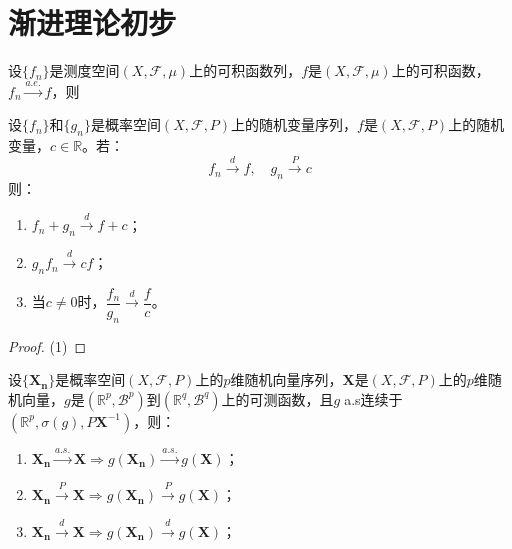 \chapter{渐进理论初步}

\begin{theorem}
	设$\{f_n\}$是测度空间$(X,\mathscr{F},\mu)$上的可积函数列，$f$是$(X,\mathscr{F},\mu)$上的可积函数，$f_n\overset{a.e.}{\longrightarrow}f$，则
\end{theorem}
\begin{theorem}\label{theo:Slutsky}
	设$\{f_n\}$和$\{g_n\}$是概率空间$(X,\mathscr{F},P)$上的随机变量序列，$f$是$(X,\mathscr{F},P)$上的随机变量，$c\in\mathbb{R}$。若：
	\begin{equation*}
		f_n\overset{d}{\longrightarrow}f,\quad g_n\overset{P}{\longrightarrow}c
	\end{equation*}
	则：
	\begin{enumerate}
		\item $f_n+g_n\overset{d}{\longrightarrow}f+c$；
		\item $g_nf_n\overset{d}{\longrightarrow}cf$；
		\item 当$c\ne0$时，$\dfrac{f_n}{g_n}\overset{d}{\longrightarrow}\dfrac{f}{c}$。
	\end{enumerate}
\end{theorem}
\begin{proof}
	(1)
\end{proof}
\begin{theorem}\label{theo:ContinuousMappingTheorem}
	设$\{\mathbf{X_n}\}$是概率空间$(X,\mathscr{F},P)$上的$p$维随机向量序列，$\mathbf{X}$是$(X,\mathscr{F},P)$上的$p$维随机向量，$g$是$(\mathbb{R}^{p},\mathcal{B}^p)$到$(\mathbb{R}^{q},\mathcal{B}^q)$上的可测函数，且$g\;$a.s连续于$(\mathbb{R}^{p},\sigma(g),P\mathbf{X}^{-1})$，则：
	\begin{enumerate}
		\item $\mathbf{X_n}\overset{a.s.}{\longrightarrow}\mathbf{X}\Rightarrow g(\mathbf{X_n})\overset{a.s.}{\longrightarrow}g(\mathbf{X})$；
		\item $\mathbf{X_n}\overset{P}{\longrightarrow}\mathbf{X}\Rightarrow g(\mathbf{X_n})\overset{P}{\longrightarrow}g(\mathbf{X})$；
		\item $\mathbf{X_n}\overset{d}{\longrightarrow}\mathbf{X}\Rightarrow g(\mathbf{X_n})\overset{d}{\longrightarrow}g(\mathbf{X})$；
	\end{enumerate}
\end{theorem}
